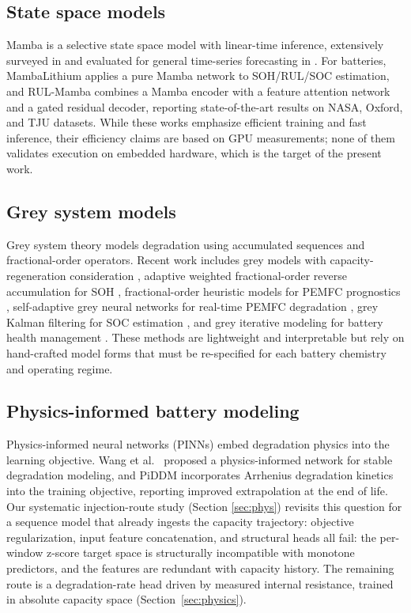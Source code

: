 \subsection{State space models}

Mamba \cite{ref_mamba} is a selective state space model with
linear-time inference, extensively surveyed in \cite{ref_mamba_survey}
and evaluated for general time-series forecasting in
\cite{ref_samamba_tsf}. For batteries, MambaLithium \cite{ref_mambalithium}
applies a pure Mamba network to SOH/RUL/SOC estimation, and RUL-Mamba
\cite{ref_rulmamba} combines a Mamba encoder with a feature attention
network and a gated residual decoder, reporting state-of-the-art
results on NASA, Oxford, and TJU datasets. While these works emphasize
efficient training and fast inference, their efficiency claims are
based on GPU measurements; none of them validates execution on
embedded hardware, which is the target of the present work.

\subsection{Grey system models}

Grey system theory models degradation using accumulated sequences and
fractional-order operators. Recent work includes grey models with
capacity-regeneration consideration \cite{ref_grey_hybrid}, adaptive
weighted fractional-order reverse accumulation for SOH
\cite{ref_grey_frac}, fractional-order heuristic models for PEMFC
prognostics \cite{ref_grey_pemfc}, self-adaptive grey neural networks
for real-time PEMFC degradation \cite{ref_grey_nn}, grey Kalman
filtering for SOC estimation \cite{ref_grey_kalman}, and grey
iterative modeling for battery health management \cite{ref_grey_iter}.
These methods are lightweight and interpretable but rely on
hand-crafted model forms that must be re-specified for each battery
chemistry and operating regime.

\subsection{Physics-informed battery modeling}

Physics-informed neural networks (PINNs) embed degradation physics
into the learning objective. Wang et al.\ \cite{ref_wang_pinn}
proposed a physics-informed network for stable degradation modeling,
and PiDDM \cite{ref_piddm} incorporates Arrhenius degradation kinetics
into the training objective, reporting improved extrapolation at the
end of life. Our systematic injection-route study (Section
\ref{sec:phys}) revisits this question for a sequence model that
already ingests the capacity trajectory: objective regularization,
input feature concatenation, and structural heads all fail: the
per-window z-score target space is structurally incompatible with
monotone predictors, and the features are redundant with capacity
history. The remaining route is a degradation-rate head driven by
measured internal resistance, trained in absolute capacity space
(Section~\ref{sec:physics}).

